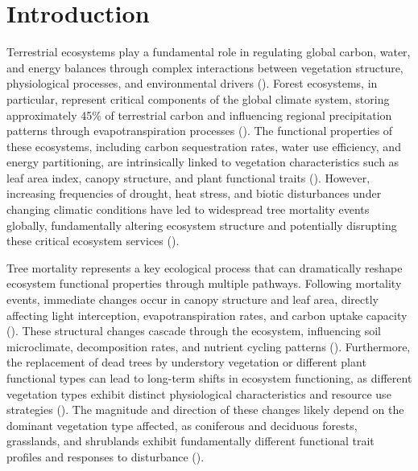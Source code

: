 \documentclass[pdflatex,sn-nature]{sn-jnl}%
\theoremstyle{thmstyleone}%
\theoremstyle{thmstyletwo}%
\theoremstyle{thmstylethree}%
\begin{document}



\maketitle

\section{Introduction}\label{sec1}
Terrestrial ecosystems play a fundamental role in regulating global carbon, water, and energy balances through complex interactions between vegetation structure, physiological processes, and environmental drivers (\cite{bonan2008forests, fisher2018vegetation}). Forest ecosystems, in particular, represent critical components of the global climate system, storing approximately 45\% of terrestrial carbon and influencing regional precipitation patterns through evapotranspiration processes (\cite{pan2011large, ellison2017trees}). The functional properties of these ecosystems, including carbon sequestration rates, water use efficiency, and energy partitioning, are intrinsically linked to vegetation characteristics such as leaf area index, canopy structure, and plant functional traits (\cite{wright2004worldwide, diazGlobalSpectrumPlant2016}). However, increasing frequencies of drought, heat stress, and biotic disturbances under changing climatic conditions have led to widespread tree mortality events globally, fundamentally altering ecosystem structure and potentially disrupting these critical ecosystem services (\cite{allen2010global, anderegg2013consequences}).

Tree mortality represents a key ecological process that can dramatically reshape ecosystem functional properties through multiple pathways. Following mortality events, immediate changes occur in canopy structure and leaf area, directly affecting light interception, evapotranspiration rates, and carbon uptake capacity (\cite{hicke2012effects, edburg2012cascading}). These structural changes cascade through the ecosystem, influencing soil microclimate, decomposition rates, and nutrient cycling patterns (\cite{breshears2005regional, adams2009temperature}). Furthermore, the replacement of dead trees by understory vegetation or different plant functional types can lead to long-term shifts in ecosystem functioning, as different vegetation types exhibit distinct physiological characteristics and resource use strategies (\cite{hartmann2018research, hammond2022global}). The magnitude and direction of these changes likely depend on the dominant vegetation type affected, as coniferous and deciduous forests, grasslands, and shrublands exhibit fundamentally different functional trait profiles and responses to disturbance (\cite{franklin1987tree, flower2015responses}).
\end{document}

